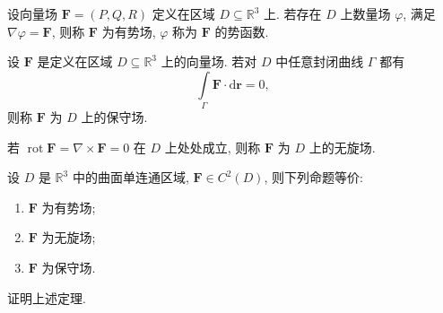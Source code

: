 \documentclass[../数学分析培优讲义.tex]{subfiles}
\begin{document}
\begin{definition}
设向量场 $\bm F=(P,Q,R)$ 定义在区域 $D\subseteq\mathbb{R}^3$ 上. 若存在 $D$ 上数量场 $\varphi$, 满足 $\nabla\varphi=\bm F$, 则称 $\bm F$ 为有势场, $\varphi$ 称为 $\bm F$ 的势函数.
\end{definition}

\begin{definition}
设 $\bm F$ 是定义在区域 $D\subseteq\mathbb{R}^3$ 上的向量场. 若对 $D$ 中任意封闭曲线 $\Gamma$ 都有
\[
    \int\limits_\Gamma\bm F\cdot\mathrm{d}\bm r=0,
\]
则称 $\bm F$ 为 $D$ 上的保守场.
\end{definition}

\begin{example}
若 $\operatorname{rot}\bm F=\nabla\times\bm F=0$ 在 $D$ 上处处成立, 则称 $\bm F$ 为 $D$ 上的无旋场.
\end{example}
\exampleblank

\begin{theorem}[\markstar]
设 $D$ 是 $\mathbb{R}^3$ 中的曲面单连通区域, $\bm F\in C^2(D)$, 则下列命题等价:
\begin{enumerate}[label=(\arabic*)]
    \item $\bm F$ 为有势场;
    \item $\bm F$ 为无旋场;
    \item $\bm F$ 为保守场.
\end{enumerate}
\end{theorem}

\begin{example}
证明上述定理.
\end{example}
\exampleblank
\end{document}
